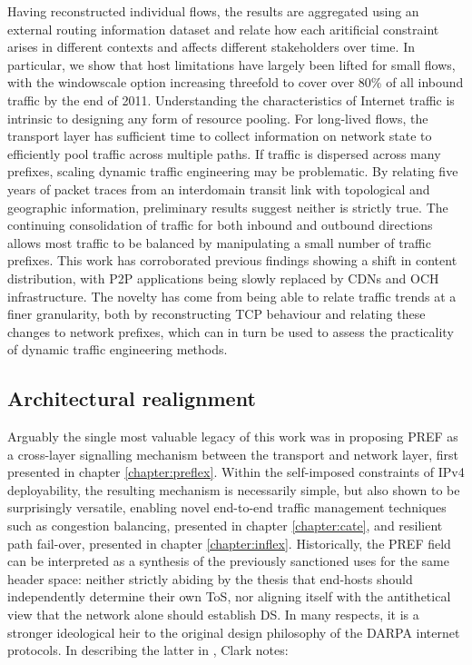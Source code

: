 Having reconstructed individual flows, the results are aggregated using an external routing information dataset and relate how each aritificial constraint arises in different contexts and affects different stakeholders over time. 
In particular, we show that host limitations have largely been lifted for small flows, with the windowscale option increasing threefold to cover over 80\% of all inbound traffic by the end of 2011. 
Understanding the characteristics of Internet traffic is intrinsic to designing any form of resource pooling.
For long-lived flows, the transport layer has sufficient time to collect information on network state to efficiently pool traffic across multiple paths.
If traffic is dispersed across many prefixes, scaling dynamic traffic engineering may be problematic.
By relating five years of packet traces from an interdomain transit link with topological and geographic information, preliminary results suggest neither is strictly true.
The continuing consolidation of traffic for both inbound and outbound directions allows most traffic to be balanced by manipulating a small number of traffic prefixes.
This work has corroborated previous findings \cite{Labovitz:2010p175} showing a shift in content distribution, with \acf{P2P} applications being slowly replaced by \acfp{CDN} and \acf{OCH} infrastructure.
The novelty has come from being able to relate traffic trends at a finer granularity, both by reconstructing \ac{TCP} behaviour and relating these changes to network prefixes, which can in turn be used to assess the practicality of dynamic traffic engineering methods.


\subsection{Architectural realignment}


Arguably the single most valuable legacy of this work was in proposing \acf{PREF} as a cross-layer signalling mechanism between the transport and network layer, first presented in chapter \ref{chapter:preflex}.
Within the self-imposed constraints of \ac{IPv4} deployability, the resulting mechanism is necessarily simple, but also shown to be surprisingly versatile, enabling novel end-to-end traffic management techniques such as congestion balancing, presented in chapter \ref{chapter:cate}, and resilient path fail-over, presented in chapter \ref{chapter:inflex}.
Historically, the \ac{PREF} field can be interpreted as a synthesis of the previously sanctioned uses for the same header space: neither strictly abiding by the thesis that end-hosts should independently determine their own \acf{ToS}, nor aligning itself with the antithetical view that the network alone should establish \acf{DS}.
In many respects, it is a stronger ideological heir to the original design philosophy of the \ac{DARPA} internet protocols. In describing the latter in \cite{Clark:1988p478}, Clark notes:

